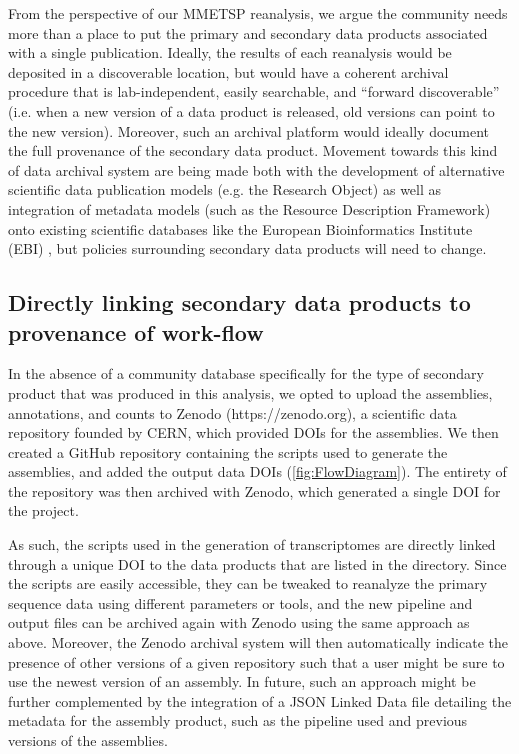 \documentclass[a4paper,num-refs]{oup-contemporary}
\begin{document}
From the perspective of our MMETSP reanalysis, we argue the community needs more than a place to put the primary and secondary data products associated with a single publication. Ideally, the results of each reanalysis would be deposited in a discoverable location, but would have a coherent archival procedure that is lab-independent, easily searchable, and ``forward discoverable'' (i.e. when a  new version of a data product is released, old versions can point to the new version). Moreover, such an archival platform would ideally document the full provenance of the secondary data product. Movement towards this kind of data archival system are being made both with the development of alternative scientific data publication models (e.g. the Research Object\cite{Bechhofer2013}) as well as integration of metadata models (such as the Resource Description Framework) onto existing scientific databases like the European Bioinformatics Institute (EBI) \cite{Callahan2013}, but policies surrounding secondary data products will need to change.

\subsection{Directly linking secondary data products to provenance of work-flow}


In the absence of a community database specifically for the type of
secondary product that was produced in this analysis, we opted to
upload the assemblies, annotations, and counts to Zenodo
(https://zenodo.org), a scientific data repository founded by CERN,
which provided DOIs for the assemblies.  We then created a GitHub
repository containing the scripts used to generate the assemblies, and
added the output data DOIs (\ref{fig:FlowDiagram}).  The entirety of the
repository was then archived with Zenodo, which generated a single DOI
for the project.

As such, the scripts used in the generation of transcriptomes are
directly linked through a unique DOI to the data products that are
listed in the directory. Since the scripts are easily accessible, they
can be tweaked to reanalyze the primary sequence data using different
parameters or tools, and the new pipeline and output files can be
archived again with Zenodo using the same approach as above.
Moreover, the Zenodo archival system will then automatically indicate
the presence of other versions of a given repository such that a user
might be sure to use the newest version of an assembly. In future,
such an approach might be further complemented by the integration of a
JSON Linked Data file detailing the metadata for the assembly product,
such as the pipeline used and previous versions of the assemblies.
\end{document}
